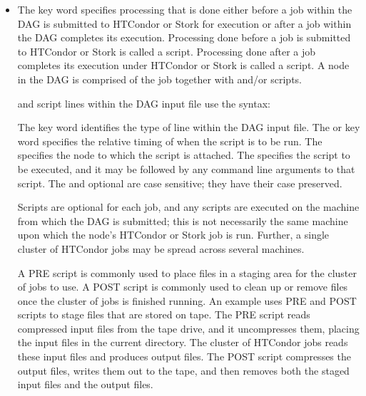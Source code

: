 \begin{itemize}
\label{dagman:SCRIPT}
\item {}

The  key word specifies
processing that is done either before a job within
the DAG is submitted to HTCondor or Stork for execution
or after
a job within
the DAG completes its execution.
Processing done before a job is submitted to HTCondor or Stork is
called a  script.
Processing done after a job completes
its execution under HTCondor or Stork is
called a  script.
A node in the DAG is comprised of the job together with
 and/or  scripts.

 and  script lines within the DAG input file
use the syntax:

    

     

The  key word identifies the type of line within
the DAG input file.
The  or  key word
specifies the relative timing of when the script is to be run.
The  specifies the node to which the script is attached.
The 
specifies the script to be executed, and it
may be followed by any command line arguments to that script.
The  and optional  are
case sensitive; they have their case preserved.  

Scripts are optional for each job, and
any scripts are executed on the machine
from which the DAG is submitted; this is not necessarily
the same machine upon which the node's HTCondor or Stork job is run.
Further, a single cluster of HTCondor jobs may be
spread across several machines.

A PRE script is commonly used
to place files in a staging area for the cluster of jobs to use.
A POST script is commonly used
to clean up or remove files once the cluster of jobs is finished running.
An example uses PRE and POST scripts to stage files
that are stored on tape.
The PRE script reads compressed input files from the tape drive,
and it uncompresses them, placing the input files in the current directory.
The cluster of HTCondor jobs reads these input files
and produces output files.
The POST script compresses the output files, writes them out to
the tape, and then removes both the staged input files and the output files.


\end{itemize}
